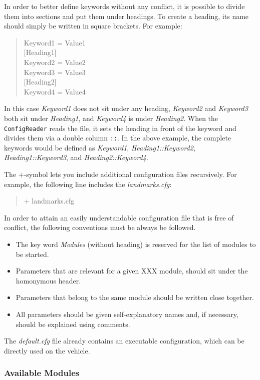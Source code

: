 \documentclass[a4paper, 11pt]{article}
\newcommand{\code}[1]{\texttt{#1}}
\begin{document}
In order to better define keywords without any conflict, it is possible to divide them into sections and put them under headings. To create a heading, its name should simply be written in square brackets. For example:
\begin{quote}
\mbox{}Keyword1 = Value1 \\
\mbox{}[Heading1] \\
\mbox{}Keyword2 = Value2 \\
\mbox{}Keyword3 = Value3 \\
\mbox{}[Heading2] \\
\mbox{}Keyword4 = Value4
\end{quote}
In this case \textit{Keyword1} does not sit under any heading, \textit{Keyword2} and \textit{Keyword3} both sit under \textit{Heading1}, and \textit{Keyword4} is under \textit{Heading2}. When the \code{ConfigReader} reads the file, it sets the heading in front of the keyword and divides them via a double column \texttt{::}. In the above example, the complete keywords would be defined as \textit{Keyword1}, \textit{Heading1::Keyword2}, \textit{Heading1::Keyword3}, and \textit{Heading2::Keyword4}.

The +-symbol lets you include additional configuration files recursively. For example, the following line includes the \textit{landmarks.cfg}:
\begin{quote}
+ landmarks.cfg
\end{quote}

In order to attain an easily understandable configuration file that is free of conflict, the following conventions must be always be followed.
\begin{itemize}
\item The key word \textit{Modules} (without heading) is reserved for the list of modules to be started.
\item Parameters that are relevant for a given XXX module, should sit under the homonymous header. 
\item Parameters that belong to the same module should be written close together.
\item All parameters should be given self-explanatory names and, if necessary, should be explained using comments.
\end{itemize}

The \textit{default.cfg} file already contains an executable configuration, which can be directly used on the vehicle. 

\subsubsection{Available Modules}
\label{sec:modules}
\end{document}
